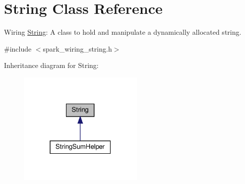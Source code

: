 \hypertarget{class_string}{}\section{String Class Reference}
\label{class_string}


Wiring \hyperlink{class_string}{String}\+: A class to hold and manipulate a dynamically allocated string.  




{\ttfamily \#include $<$spark\+\_\+wiring\+\_\+string.\+h$>$}



Inheritance diagram for String\+:
\nopagebreak
\begin{figure}[H]
\begin{center}
\leavevmode
\includegraphics[width=171pt]{class_string__inherit__graph}
\end{center}
\end{figure}
